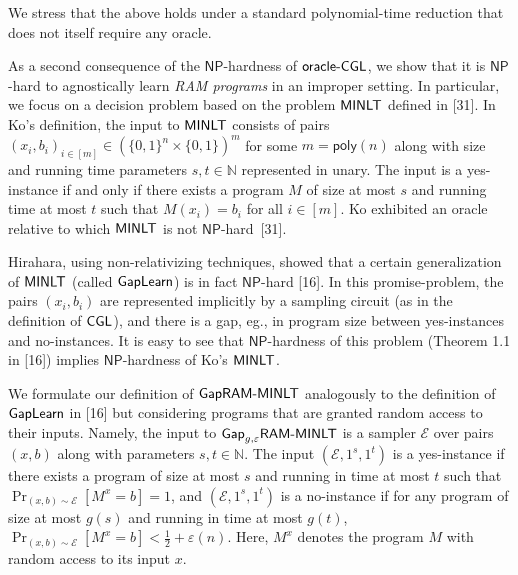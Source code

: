 


We stress that the above holds under a standard polynomial-time reduction that does not itself require any oracle.\par




As a second consequence of the ${\mathsf{NP}}$-hardness of ${\sf oracle}\text{-}{\sf CGL}$, we show that it is ${\mathsf{NP}}$-hard to agnostically learn \emph{RAM programs} in an improper setting. In particular, we focus on a decision problem based on the problem ${\sf MINLT}$ defined in [31]. In Ko’s definition, the input to ${\sf MINLT}$ consists of pairs $(x_{i},b_{i})_{i\in[m]}\in(\{0,1\}^{n}\times\{0,1\})^{m}$ for some $m={\mathsf{poly}}(n)$ along with size and running time parameters $s,t\in\mathbb{N}$ represented in unary. The input is a yes-instance if and only if there exists a program $M$ of size at most $s$ and running time at most $t$ such that $M(x_{i})=b_{i}$ for all $i\in[m]$. Ko exhibited an oracle relative to which ${\sf MINLT}$ is not ${\mathsf{NP}}$-hard [31].\par




Hirahara, using non-relativizing techniques, showed that a certain generalization of ${\sf MINLT}$ (called ${\sf GapLearn}$) is in fact ${\mathsf{NP}}$-hard [16]. In this promise-problem, the pairs $(x_{i},b_{i})$ are represented implicitly by a sampling circuit (as in the definition of ${\sf CGL}$), and there is a gap, eg., in program size between yes-instances and no-instances. It is easy to see that ${\mathsf{NP}}$-hardness of this problem (Theorem 1.1 in [16]) implies ${\mathsf{NP}}$-hardness of Ko’s ${\sf MINLT}$.\par




We formulate our definition of ${\sf Gap}{\sf RAM}\text{-}{\sf MINLT}$ analogously to the definition of ${\sf GapLearn}$ in [16] but considering programs that are granted random access to their inputs. Namely, the input to ${\sf Gap}_{g,\varepsilon}{\sf RAM}\text{-}{\sf MINLT}$ is a sampler $\mathcal{E}$ over pairs $(x,b)$ along with parameters $s,t\in\mathbb{N}$. The input $(\mathcal{E},1^{s},1^{t})$ is a yes-instance if there exists a program of size at most $s$ and running in time at most $t$ such that $\Pr_{(x,b)\sim\mathcal{E}}[M^{x}=b]=1$, and $(\mathcal{E},1^{s},1^{t})$ is a no-instance if for any program of size at most $g(s)$ and running in time at most $g(t)$, $\Pr_{(x,b)\sim\mathcal{E}}[M^{x}=b]<\frac{1}{2}+\varepsilon(n)$. Here, $M^{x}$ denotes the program $M$ with random access to its input $x$.\par




